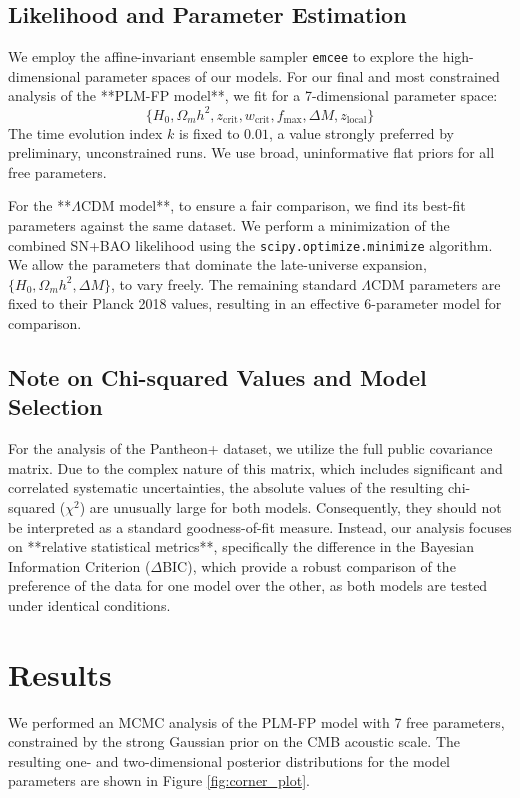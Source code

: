 \documentclass[12pt, a4paper]{article}
\begin{document}
\subsection{Likelihood and Parameter Estimation}
We employ the affine-invariant ensemble sampler \texttt{emcee} \cite{emcee} to explore the high-dimensional parameter spaces of our models. For our final and most constrained analysis of the **PLM-FP model**, we fit for a 7-dimensional parameter space:
$$ \{H_0, \Omega_m h^2, z_{\text{crit}}, w_{\text{crit}}, f_{\max}, \Delta M, z_{\text{local}}\} $$
The time evolution index $k$ is fixed to $0.01$, a value strongly preferred by preliminary, unconstrained runs. We use broad, uninformative flat priors for all free parameters.

For the **$\Lambda$CDM model**, to ensure a fair comparison, we find its best-fit parameters against the same dataset. We perform a minimization of the combined SN+BAO likelihood using the \texttt{scipy.optimize.minimize} algorithm. We allow the parameters that dominate the late-universe expansion, $\{H_0, \Omega_m h^2, \Delta M\}$, to vary freely. The remaining standard $\Lambda$CDM parameters are fixed to their Planck 2018 values, resulting in an effective 6-parameter model for comparison.

\subsection{Note on Chi-squared Values and Model Selection}
For the analysis of the Pantheon+ dataset, we utilize the full public covariance matrix. Due to the complex nature of this matrix, which includes significant and correlated systematic uncertainties, the absolute values of the resulting chi-squared ($\chi^2$) are unusually large for both models. Consequently, they should not be interpreted as a standard goodness-of-fit measure. Instead, our analysis focuses on **relative statistical metrics**, specifically the difference in the Bayesian Information Criterion ($\Delta$BIC), which provide a robust comparison of the preference of the data for one model over the other, as both models are tested under identical conditions.

\section{Results}
We performed an MCMC analysis of the PLM-FP model with 7 free parameters, constrained by the strong Gaussian prior on the CMB acoustic scale. The resulting one- and two-dimensional posterior distributions for the model parameters are shown in Figure \ref{fig:corner_plot}.
\end{document}
